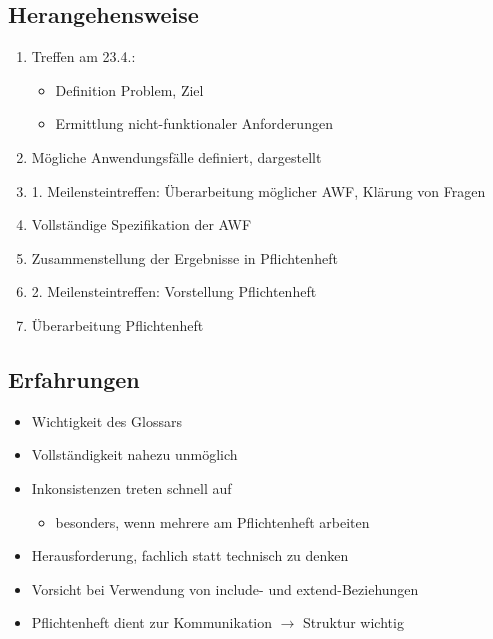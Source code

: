 \documentclass{beamer}
\begin{document}
  \subsection{Herangehensweise}
  \begin{frame}{\subsecname}
    \begin{enumerate}
      \item Treffen am 23.4.:
      \begin{itemize}
        \item Definition Problem, Ziel
        \item Ermittlung nicht-funktionaler Anforderungen
      \end{itemize}
      \item Mögliche Anwendungsfälle definiert, dargestellt
      \item 1. Meilensteintreffen: Überarbeitung möglicher AWF, Klärung von Fragen
      \item Vollständige Spezifikation der AWF
      \item Zusammenstellung der Ergebnisse in Pflichtenheft
      \item 2. Meilensteintreffen: Vorstellung Pflichtenheft
      \item Überarbeitung Pflichtenheft
    \end{enumerate}
  \end{frame}

  \subsection{Erfahrungen}
  \begin{frame}{\subsecname}
    \begin{itemize}
      \item Wichtigkeit des Glossars
      \item Vollständigkeit nahezu unmöglich
      \item Inkonsistenzen treten schnell auf
        \begin{itemize}
          \item besonders, wenn mehrere am Pflichtenheft arbeiten
        \end{itemize}
      \item Herausforderung, fachlich statt technisch zu denken
      \item Vorsicht bei Verwendung von include- und extend-Beziehungen
      \item Pflichtenheft dient zur Kommunikation $\to$ Struktur wichtig
    \end{itemize}
  \end{frame}
\end{document}
